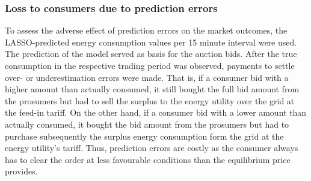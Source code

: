 \subsubsection{Loss to consumers due to prediction errors}

To assess the adverse effect of prediction errors on the market outcomes, the LASSO-predicted energy consumption values per 15 minute interval were used. The prediction of the model served as basis for the auction bids. After the true consumption in the respective trading period was observed, payments to settle over- or underestimation errors were made. That is, if a consumer bid with a higher amount than actually consumed, it still bought the full bid amount from the prosumers but had to sell the surplus to the energy utility over the grid at the feed-in tariff. On the other hand, if a consumer bid with a lower amount than actually consumed, it bought the bid amount from the prosumers but had to purchase subsequently the surplus energy consumption form the grid at the energy utility's tariff. Thus, prediction errors are costly as the consumer always has to clear the order at less favourable conditions than the equilibrium price provides.

